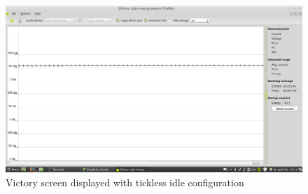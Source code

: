 \begin{figure}[H]
  \centering
  \includegraphics[clip, trim=0cm 0cm 0cm 0cm, width=12cm]{fig/victoryscreen-idle.png}
  \caption{Victory screen displayed with tickless idle configuration}
\end{figure}

